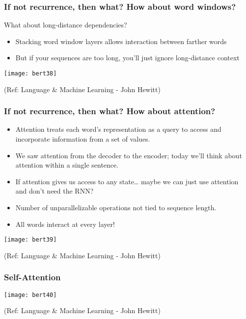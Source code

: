 \begin{frame}[fragile]\frametitle{If not recurrence, then what? How about word windows?}

What about long-distance dependencies?

\begin{itemize}
\item Stacking word window layers allows interaction between farther words
\item But if your sequences are too long, you’ll just ignore long-distance context

\end{itemize}	 

\begin{center}
\texttt{[image: bert38]}
\end{center}	

 
{\tiny (Ref: Language \& Machine Learning - John Hewitt)}
\end{frame}

\begin{frame}[fragile]\frametitle{If not recurrence, then what? How about attention?}


\begin{itemize}
\item Attention treats each word’s representation as a query to access and  incorporate information from a set of values.
\item We saw attention from the decoder to the encoder; today we’ll think about
attention within a single sentence.
\item If attention gives us access to any state… maybe we can just use attention and don’t need the RNN?
\item Number of unparallelizable operations not tied to sequence length.
\item All words interact at every layer!

\end{itemize}	 

\begin{center}
\texttt{[image: bert39]}
\end{center}	

 
{\tiny (Ref: Language \& Machine Learning - John Hewitt)}
\end{frame}

\begin{frame}[fragile]\frametitle{Self-Attention}


\begin{center}
\texttt{[image: bert40]}
\end{center}	

 
{\tiny (Ref: Language \& Machine Learning - John Hewitt)}
\end{frame}

